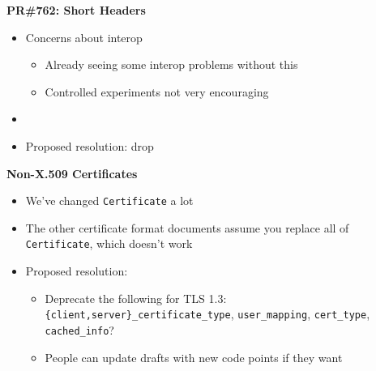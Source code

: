 \documentclass[helvetica]{seminar}
\newcommand{\heading}[1]{%
  \begin{center} 
    \large\bf 
    #1 
  \end{center} 
  \vspace{.4 in}}
\begin{document}
\begin{slide}
\heading{PR\#762: Short Headers}

\begin{itemize}
\item Concerns about interop
  \begin{itemize}
  \item Already seeing some interop problems without this
  \item Controlled experiments not very encouraging
  \end{itemize}
\item[]
\item Proposed resolution: drop
\end{itemize}
\end{slide}


\begin{slide}
\heading{Non-X.509 Certificates}

\begin{itemize}
\item We've changed \texttt{Certificate} a lot
\item The other certificate format documents assume you replace all
  of \verb^Certificate^, which doesn't work
\item Proposed resolution:
  \begin{itemize}
  \item Deprecate the following for TLS 1.3: \verb^{client,server}_certificate_type^, \verb^user_mapping^, \verb^cert_type^, \verb^cached_info^?
  \item People can update drafts with new code points if they want
  \end{itemize}
\end{itemize}

\end{slide}
\end{document}
